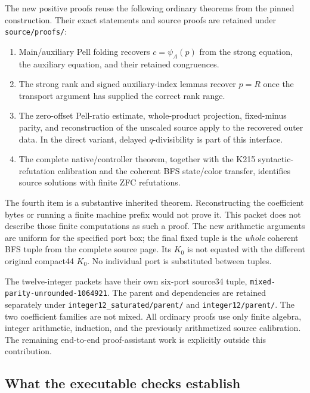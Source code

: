 \documentclass[11pt,letterpaper]{article}
\theoremstyle{remark}\newtheorem{remark}[theorem]{Remark}
\begin{document}
The new positive proofs reuse the following ordinary theorems from the
pinned construction.  Their exact statements and source proofs are
retained under \texttt{source/proofs/}:
\begin{enumerate}
\item Main/auxiliary Pell folding recovers $c=\psi_A(p)$ from the strong
      equation, the auxiliary equation, and their retained congruences.
\item The strong rank and signed auxiliary-index lemmas recover $p=R$
      once the transport argument has supplied the correct rank range.
\item The zero-offset Pell-ratio estimate, whole-product projection,
      fixed-minus parity, and reconstruction of the unscaled source
      apply to the recovered outer data.  In the direct variant, delayed
      $q$-divisibility is part of this interface.
\item The complete native/controller theorem, together with the K215
      syntactic-refutation calibration and the coherent BFS state/color
      transfer, identifies source solutions with finite ZFC refutations.
\end{enumerate}
The fourth item is a substantive inherited theorem.  Reconstructing the
coefficient bytes or running a finite machine prefix would not prove it.
This packet does not describe those finite computations as such a proof.
The new arithmetic arguments are uniform for the specified port box;
the final fixed tuple is the \emph{whole} coherent BFS tuple from the
complete source page.  Its $K_0$ is not equated with the different original
compact44 $K_0$.  No individual port is substituted between tuples.

The twelve-integer packets have their own six-port source34 tuple,
\texttt{mixed-parity-unrounded-1064921}.  The parent and dependencies are
retained separately under \texttt{integer12\_saturated/parent/} and
\texttt{integer12/parent/}.  The two coefficient
families are not mixed.  All ordinary proofs use only finite algebra,
integer arithmetic, induction, and the previously arithmetized source
calibration.  The remaining end-to-end proof-assistant work is explicitly
outside this contribution.

\subsection{What the executable checks establish}
\end{document}
